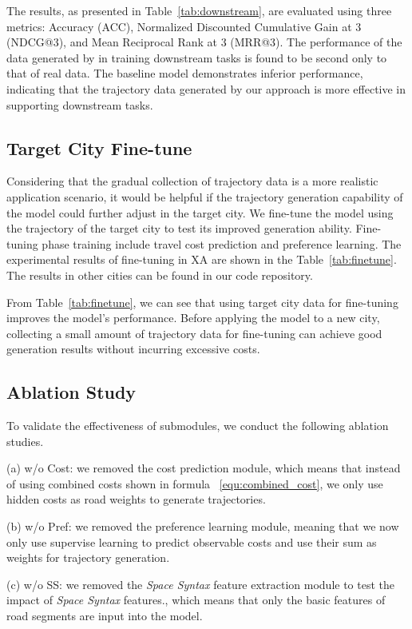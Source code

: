The results, as presented in Table~\ref{tab:downstream}, are evaluated using three metrics: Accuracy (ACC), Normalized Discounted Cumulative Gain at 3 (NDCG@3), and Mean Reciprocal Rank at 3 (MRR@3). The performance of the data generated by \name in training downstream tasks is found to be second only to that of real data. The baseline model demonstrates inferior performance, indicating that the trajectory data generated by our approach is more effective in supporting downstream tasks.

\subsection{Target City Fine-tune}

Considering that the gradual collection of trajectory data is a more realistic application scenario, it would be helpful if the trajectory generation capability of the model could further adjust in the target city. We fine-tune the model using the trajectory of the target city to test its improved generation ability. Fine-tuning phase training include travel cost prediction and preference learning. The experimental results of fine-tuning in XA are shown in the Table~\ref{tab:finetune}.  The results in other cities can be found in our code repository.

From Table~\ref{tab:finetune}, we can see that using target city data for fine-tuning improves the model's performance. Before applying the model to a new city, collecting a small amount of trajectory data for fine-tuning can achieve good generation results without incurring excessive costs.

\subsection{Ablation Study}

To validate the effectiveness of submodules, we conduct the following ablation studies.

(a) w/o Cost: we removed the cost prediction module, which means that instead of using combined costs shown in formula ~\ref{equ:combined_cost}, we only use hidden costs as road weights to generate trajectories.

(b) w/o Pref: we removed the preference learning module, meaning that we now only use supervise learning to predict observable costs and use their sum as weights for trajectory generation. 

(c) w/o SS: we removed the \textit{Space Syntax} feature extraction module to test the impact of \textit{Space Syntax} features., which means that only the basic features of road segments are input into the model.

